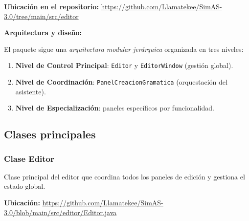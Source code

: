 \textbf{Ubicación en el repositorio:} \url{https://github.com/Llamatekee/SimAS-3.0/tree/main/src/editor}

\textbf{Arquitectura y diseño:}

El paquete sigue una \textit{arquitectura modular jerárquica} organizada en tres niveles:
\begin{enumerate}
    \item \textbf{Nivel de Control Principal}: \texttt{Editor} y \texttt{EditorWindow} (gestión global).
    \item \textbf{Nivel de Coordinación}: \texttt{PanelCreacionGramatica} (orquestación del asistente).
    \item \textbf{Nivel de Especialización}: paneles específicos por funcionalidad.
\end{enumerate}

\subsection{Clases principales}

\subsubsection{Clase Editor}

Clase principal del editor que coordina todos los paneles de edición y gestiona el estado global.

\textbf{Ubicación:} \url{https://github.com/Llamatekee/SimAS-3.0/blob/main/src/editor/Editor.java}

